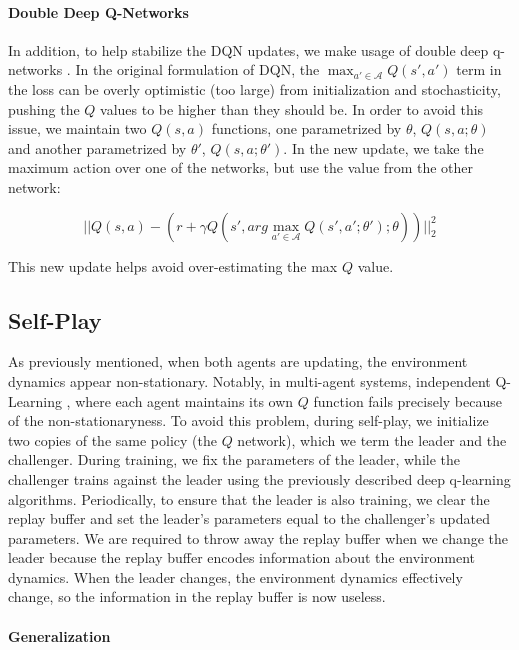 \documentclass[10pt,twocolumn,letterpaper]{article}
\begin{document}
\paragraph{Double Deep Q-Networks}
In addition, to help stabilize the DQN updates, we make usage of double deep
q-networks \citep{doubleDQN}. In the original formulation of DQN, the
$\max_{a' \in \mathcal{A}}Q(s', a')$ term in the loss can be overly optimistic
(too large) from initialization and stochasticity, pushing the $Q$ values to
be higher than they should be. In order to avoid this issue, we maintain two
$Q(s, a)$ functions, one parametrized by $\theta$, $Q(s, a; \theta)$ and
another parametrized by $\theta'$, $Q(s, a; \theta')$. In the new update, we
take the maximum action over one of the networks, but use the value from the
other network:

\begin{equation}
  ||Q(s, a) - (r + \gamma Q(s', arg\max_{a' \in \mathcal{A}}Q(s', a'; \theta'); \theta))||^2_2
\end{equation}

\noindent This new update helps avoid over-estimating the max $Q$ value.

\subsection{Self-Play}

As previously mentioned, when both agents are updating, the environment
dynamics appear non-stationary. Notably, in multi-agent systems, independent
Q-Learning \citep{tan1993multi}, where each agent maintains its own $Q$
function fails precisely because of the non-stationaryness. To avoid this
problem, during self-play, we initialize two copies of the same policy (the
$Q$ network), which we term the leader and the challenger. During training, we
fix the parameters of the leader, while the challenger trains against the
leader using the previously described deep q-learning algorithms.
Periodically, to ensure that the leader is also training, we clear the replay
buffer and set the leader's parameters equal to the challenger's updated
parameters. We are required to throw away the replay buffer when we change the
leader because the replay buffer encodes information about the environment
dynamics. When the leader changes, the environment dynamics effectively
change, so the information in the replay buffer is now useless.

\paragraph{Generalization}
\end{document}
